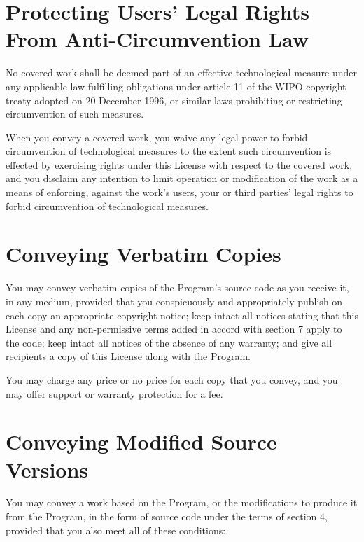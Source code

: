 \section{Protecting Users' Legal Rights From Anti-Circumvention Law}

No covered work shall be deemed part of an effective technological measure under any applicable law fulfilling obligations under article 11 of the WIPO copyright treaty adopted on 20 December 1996, or similar laws prohibiting or restricting circumvention of such measures.

When you convey a covered work, you waive any legal power to forbid circumvention of technological measures to the extent such circumvention is effected by exercising rights under this License with respect to the covered work, and you disclaim any intention to limit operation or modification of the work as a means of enforcing, against the work's users, your or third parties' legal rights to forbid circumvention of technological measures.
\section{Conveying Verbatim Copies}

You may convey verbatim copies of the Program's source code as you receive it, in any medium, provided that you conspicuously and appropriately publish on each copy an appropriate copyright notice; keep intact all notices stating that this License and any non-permissive terms added in accord with section 7 apply to the code; keep intact all notices of the absence of any warranty; and give all recipients a copy of this License along with the Program.

You may charge any price or no price for each copy that you convey, and you may offer support or warranty protection for a fee.
\section{Conveying Modified Source Versions}

You may convey a work based on the Program, or the modifications to produce it from the Program, in the form of source code under the terms of section 4, provided that you also meet all of these conditions:

